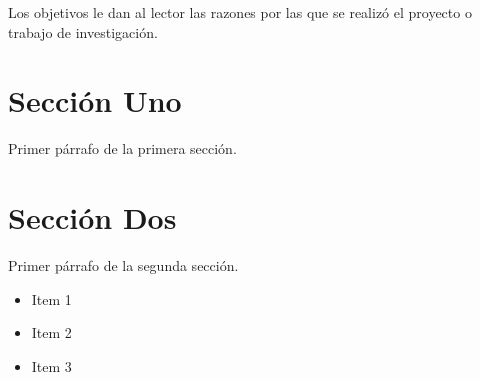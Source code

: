 
Los objetivos le dan al lector las razones por las que se realizó el
proyecto o trabajo de investigación.

\section{Sección Uno}
\label{1:sec:1}
  Primer párrafo de la primera sección.


\section{Sección Dos}
\label{1:sec:2}
  Primer párrafo de la segunda sección.

\begin{itemize}
  \item Item 1
  \item Item 2
  \item Item 3
\end{itemize}

